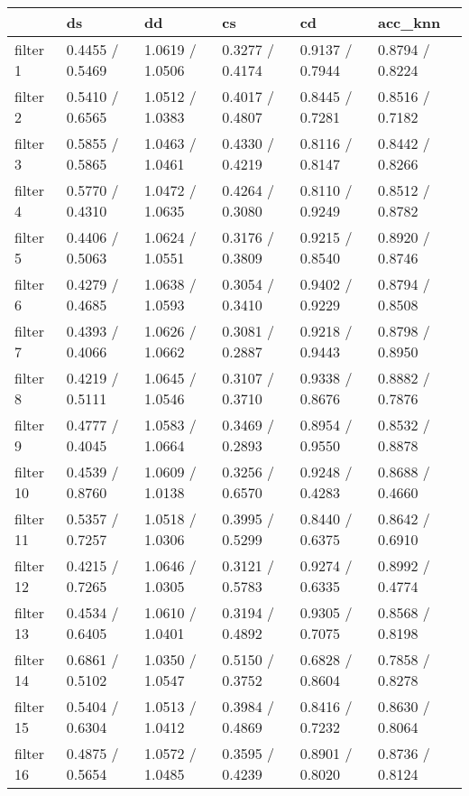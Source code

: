 \begin{tabular}{llllll}
\toprule
{} &               ds &               dd &               cs &               cd &          acc\_knn \\
\midrule
filter 1  &  0.4455 / 0.5469 &  1.0619 / 1.0506 &  0.3277 / 0.4174 &  0.9137 / 0.7944 &  0.8794 / 0.8224 \\
filter 2  &  0.5410 / 0.6565 &  1.0512 / 1.0383 &  0.4017 / 0.4807 &  0.8445 / 0.7281 &  0.8516 / 0.7182 \\
filter 3  &  0.5855 / 0.5865 &  1.0463 / 1.0461 &  0.4330 / 0.4219 &  0.8116 / 0.8147 &  0.8442 / 0.8266 \\
filter 4  &  0.5770 / 0.4310 &  1.0472 / 1.0635 &  0.4264 / 0.3080 &  0.8110 / 0.9249 &  0.8512 / 0.8782 \\
filter 5  &  0.4406 / 0.5063 &  1.0624 / 1.0551 &  0.3176 / 0.3809 &  0.9215 / 0.8540 &  0.8920 / 0.8746 \\
filter 6  &  0.4279 / 0.4685 &  1.0638 / 1.0593 &  0.3054 / 0.3410 &  0.9402 / 0.9229 &  0.8794 / 0.8508 \\
filter 7  &  0.4393 / 0.4066 &  1.0626 / 1.0662 &  0.3081 / 0.2887 &  0.9218 / 0.9443 &  0.8798 / 0.8950 \\
filter 8  &  0.4219 / 0.5111 &  1.0645 / 1.0546 &  0.3107 / 0.3710 &  0.9338 / 0.8676 &  0.8882 / 0.7876 \\
filter 9  &  0.4777 / 0.4045 &  1.0583 / 1.0664 &  0.3469 / 0.2893 &  0.8954 / 0.9550 &  0.8532 / 0.8878 \\
filter 10 &  0.4539 / 0.8760 &  1.0609 / 1.0138 &  0.3256 / 0.6570 &  0.9248 / 0.4283 &  0.8688 / 0.4660 \\
filter 11 &  0.5357 / 0.7257 &  1.0518 / 1.0306 &  0.3995 / 0.5299 &  0.8440 / 0.6375 &  0.8642 / 0.6910 \\
filter 12 &  0.4215 / 0.7265 &  1.0646 / 1.0305 &  0.3121 / 0.5783 &  0.9274 / 0.6335 &  0.8992 / 0.4774 \\
filter 13 &  0.4534 / 0.6405 &  1.0610 / 1.0401 &  0.3194 / 0.4892 &  0.9305 / 0.7075 &  0.8568 / 0.8198 \\
filter 14 &  0.6861 / 0.5102 &  1.0350 / 1.0547 &  0.5150 / 0.3752 &  0.6828 / 0.8604 &  0.7858 / 0.8278 \\
filter 15 &  0.5404 / 0.6304 &  1.0513 / 1.0412 &  0.3984 / 0.4869 &  0.8416 / 0.7232 &  0.8630 / 0.8064 \\
filter 16 &  0.4875 / 0.5654 &  1.0572 / 1.0485 &  0.3595 / 0.4239 &  0.8901 / 0.8020 &  0.8736 / 0.8124 \\
\bottomrule
\end{tabular}
